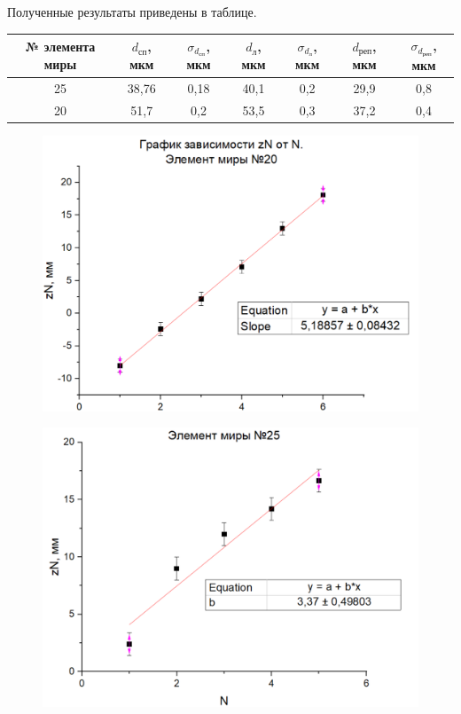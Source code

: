 \documentclass[a4paper,12pt]{article}
\begin{document}
Полученные результаты приведены в таблице.
\begin{table}[H]
\begin{tabular}{|c|c|c|c|c|c|c|}
\hline
№ элемента миры & $d_\text{сп}$, мкм & $\sigma_{d_\text{сп}}$, мкм & $d_\text{л}$, мкм & $\sigma_{d_\text{л}}$, мкм & $d_\text{реп}$, мкм & $\sigma_{d_\text{реп}}$, мкм \\ \hline
25 & 38,76 & 0,18 & 40,1 & 0,2 & 29,9 & 0,8 \\ \hline
20 & 51,7 & 0,2 & 53,5 & 0,3 & 37,2 & 0,4 \\ \hline
\end{tabular}
\end{table}
\begin{figure}[H]
\centering
\includegraphics[scale=0.4]{6.png}
\end{figure}
\begin{figure}[H]
\centering
\includegraphics[scale=0.4]{7.png}
\end{figure}
\end{document}
